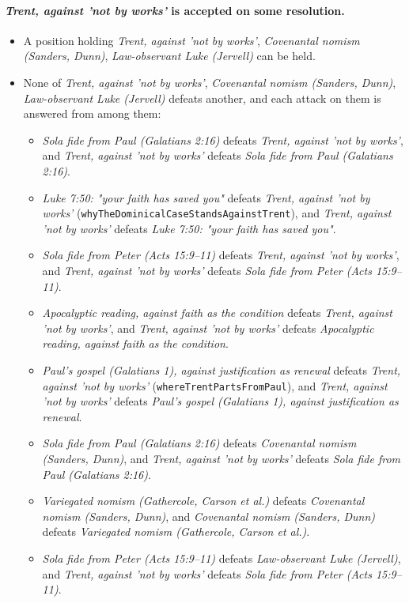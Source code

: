 \documentclass[11pt]{article}
\begin{document}
\paragraph{\emph{Trent, against 'not by works'} is accepted on some resolution.}
\begin{itemize}
\item A position holding \emph{Trent, against 'not by works'}, \emph{Covenantal nomism (Sanders, Dunn)}, \emph{Law-observant Luke (Jervell)} can be held.
\item None of \emph{Trent, against 'not by works'}, \emph{Covenantal nomism (Sanders, Dunn)}, \emph{Law-observant Luke (Jervell)} defeats another, and each attack on them is answered from among them:
\begin{itemize}
\item \emph{Sola fide from Paul (Galatians 2:16)} defeats \emph{Trent, against 'not by works'}, and \emph{Trent, against 'not by works'} defeats \emph{Sola fide from Paul (Galatians 2:16)}.
\item \emph{Luke 7:50: "your faith has saved you"} defeats \emph{Trent, against 'not by works'} (\texttt{why\allowbreak{}The\allowbreak{}Dominical\allowbreak{}Case\allowbreak{}Stands\allowbreak{}Against\allowbreak{}Trent}), and \emph{Trent, against 'not by works'} defeats \emph{Luke 7:50: "your faith has saved you"}.
\item \emph{Sola fide from Peter (Acts 15:9–11)} defeats \emph{Trent, against 'not by works'}, and \emph{Trent, against 'not by works'} defeats \emph{Sola fide from Peter (Acts 15:9–11)}.
\item \emph{Apocalyptic reading, against faith as the condition} defeats \emph{Trent, against 'not by works'}, and \emph{Trent, against 'not by works'} defeats \emph{Apocalyptic reading, against faith as the condition}.
\item \emph{Paul's gospel (Galatians 1), against justification as renewal} defeats \emph{Trent, against 'not by works'} (\texttt{where\allowbreak{}Trent\allowbreak{}Parts\allowbreak{}From\allowbreak{}Paul}), and \emph{Trent, against 'not by works'} defeats \emph{Paul's gospel (Galatians 1), against justification as renewal}.
\item \emph{Sola fide from Paul (Galatians 2:16)} defeats \emph{Covenantal nomism (Sanders, Dunn)}, and \emph{Trent, against 'not by works'} defeats \emph{Sola fide from Paul (Galatians 2:16)}.
\item \emph{Variegated nomism (Gathercole, Carson et al.)} defeats \emph{Covenantal nomism (Sanders, Dunn)}, and \emph{Covenantal nomism (Sanders, Dunn)} defeats \emph{Variegated nomism (Gathercole, Carson et al.)}.
\item \emph{Sola fide from Peter (Acts 15:9–11)} defeats \emph{Law-observant Luke (Jervell)}, and \emph{Trent, against 'not by works'} defeats \emph{Sola fide from Peter (Acts 15:9–11)}.
\end{itemize}
\end{itemize}
\end{document}
